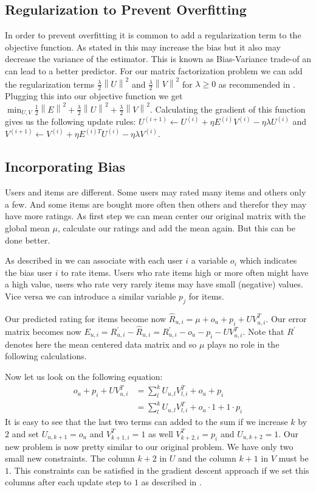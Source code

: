 \documentclass[DIV=14,twocolumn]{scrartcl}
\newcommand{\norm}[1]{\left\lVert#1\right\rVert}
\begin{document}
\subsection{Regularization to Prevent Overfitting}
In order to prevent overfitting it is common to add a regularization term to the objective function. As stated in \cite{Gi19} this may increase the bias but it also may decrease the variance of the estimator. This is known as Bias-Variance trade-of an can lead to a better predictor. For our matrix factorization problem we can  add the regularization terms $\frac{\lambda}{2}\norm{U}^2$ and $\frac{\lambda}{2}\norm{V}^2$ for $\lambda \geq 0$ as recommended in \cite{Ag16}.
Plugging this into our objective function we get $\min_{U,V} \frac{1}{2}\norm{E}^2 + \frac{\lambda}{2}\norm{U}^2 + \frac{\lambda}{2}\norm{V}^2$. Calculating the gradient of this function gives us the following update rules: $U^{(i+1)} \leftarrow U^{(i)} + \eta E^{(i)}V^{(i)} - \eta\lambda U^{(i)}$ and $V^{(i+1)} \leftarrow V^{(i)} + \eta E^{(i)T}U^{(i)} - \eta\lambda V^{(i)}$.

\subsection{Incorporating Bias}
Users and items are different. Some users may rated many items and others only a few. And some items are bought more often then others and therefor they may have more ratings. 
As first step we can mean center our original matrix with the global mean $\mu$, calculate our ratings and add the mean again. But this can be done better.

As described in \cite{Ag16} we can associate with each user $i$ a variable $o_i$ which indicates the bias user $i$ to rate items. Users who rate items high or more often might have a high value, users who rate very rarely items may have small (negative) values. Vice versa we can introduce a similar variable $p_j$ for items.
 
Our predicted rating for items become now $\hat{R}_{u,i} = \mu + o_u + p_i + UV^T_{u,i}$. Our error matrix becomes now $E_{u,i} = R_{u,i}^{'} - \hat{R}_{u,i} = R_{u,i}^{'} - o_u - p_i - UV^T_{u,i}$. Note that $R^{'}$ denotes here the mean centered data matrix and so $\mu$ plays no role in the following calculations.

Now let us look on the following equation:
\begin{equation*}
\begin{split}
o_u + p_i + UV^T_{u,i} &= \sum_{l}^{k}U_{u,l}V^T_{l,i} + o_u + p_i\\ &= \sum_{l}^{k}U_{u,l}V^T_{l,i} + o_u\cdot 1 + 1\cdot p_i
\end{split}
\end{equation*}
It is easy to see that the last two terms can added to the sum if we increase $k$ by $2$ and set $U_{u,k+1}=o_u$ and $V^T_{k+1,i}=1$ as well $V^T_{k+2,i}=p_i$ and $U_{u,k+2}=1$. Our new problem is now pretty similar to our original problem. We have only two small new constraints. The column $k+2$ in $U$ and the column $k+1$ in $V$ must be $1$.
This constraints can be satisfied in the gradient descent approach if we set this columns after each update step to $1$ as described in \cite{Ag16}.
\end{document}
